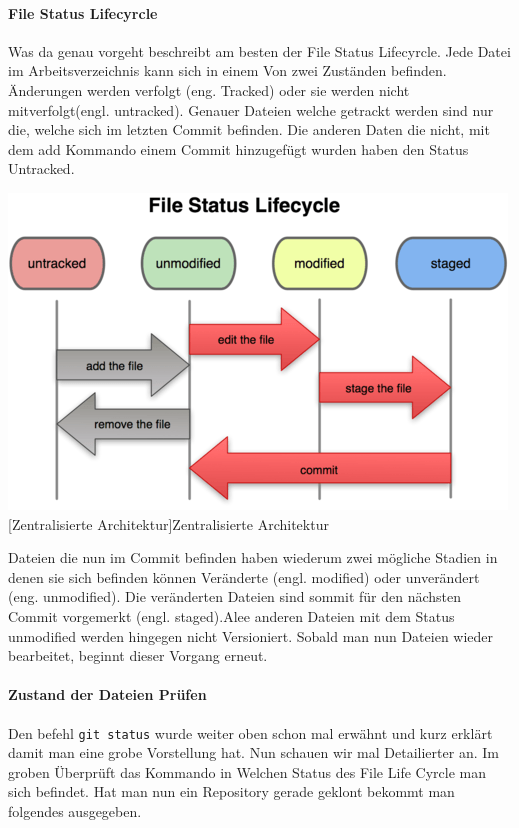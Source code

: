 \documentclass[12pt,a4paper,bibliography=totocnumbered,listof=totocnumbered]{scrartcl}
\begin{document}
\paragraph{File Status Lifecyrcle}
Was da genau vorgeht beschreibt am besten der File Status Lifecyrcle. Jede Datei im Arbeitsverzeichnis kann sich in einem Von zwei Zuständen befinden. Änderungen werden verfolgt (eng. Tracked) oder sie werden nicht mitverfolgt(engl. untracked). 
Genauer Dateien welche getrackt werden sind nur die, welche sich im letzten Commit befinden. Die anderen Daten die nicht, mit dem add Kommando einem Commit hinzugefügt wurden haben den Status Untracked. \newline


\newline
\newline
\vspace{1em}
\begin{minipage}{\linewidth}
	\centering
	\includegraphics[width=0.6\linewidth]{Bilder/flc.png}
	[Zentralisierte Architektur]{Zentralisierte Architektur\footnotemark }
	\label{fig:osgi}
\end{minipage} 	

Dateien die nun im Commit befinden haben wiederum zwei mögliche Stadien in denen sie sich befinden können Veränderte (engl. modified) oder unverändert (eng. unmodified). Die veränderten Dateien sind sommit für den nächsten Commit vorgemerkt (engl. staged).Alee anderen Dateien mit dem Status unmodified werden hingegen nicht Versioniert. Sobald man nun Dateien wieder bearbeitet, beginnt dieser Vorgang erneut.

\paragraph{Zustand der Dateien Prüfen}
Den befehl \lstinline|git status| wurde weiter oben schon mal erwähnt und kurz erklärt damit man eine grobe Vorstellung hat. Nun schauen wir mal Detailierter an. Im groben Überprüft das Kommando in Welchen Status des File Life Cyrcle man sich befindet. Hat man nun ein Repository gerade geklont bekommt man folgendes ausgegeben.
\end{document}
